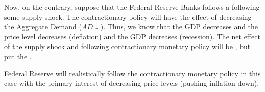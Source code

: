 \documentclass{article}
\begin{document}
Now, on the contrary, suppose that the Federal Reserve Banks follows a  following some supply shock. The contractionary policy will have the effect of decreasing the Aggregate Demand ($AD\downarrow$). Thus, we know that the GDP decreases and the price level decreases (deflation) and the GDP decreases (recession). The net effect of the supply shock and following contractionary monetary policy will be , but put the . 

\begin{remark}
  Federal Reserve will realistically follow the contractionary monetary policy in this case with the primary interest of decreasing price levels (pushing inflation down). 
\end{remark}
\end{document}

